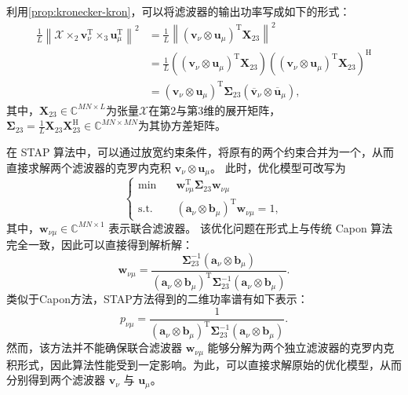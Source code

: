 利用\cref{prop:kronecker-kron}，可以将滤波器的输出功率写成如下的形式：
\[
    \begin{split}
        \frac{1}{L} \left\| \mathcal{X} \times_2 \bm{v}_{\nu}^{\mathrm{T}} \times_3 \bm{u}_{\mu}^{\mathrm{T}} \right\|^2
         & = \frac{1}{L} \left\| (\bm{v}_{\nu} \otimes \bm{u}_{\mu})^{\mathrm{T}} \mathbf{X}_{23}  \right\|^2                                                                           \\
         & = \frac{1}{L}  ((\bm{v}_{\nu} \otimes \bm{u}_{\mu})^{\mathrm{T}} \mathbf{X}_{23}) \left((\bm{v}_{\nu} \otimes \bm{u}_{\mu})^{\mathrm{T}} \mathbf{X}_{23}\right)^{\mathrm{H}} \\
         & = (\bm{v}_{\nu} \otimes \bm{u}_{\mu})^{\mathrm{T}} \mathbf{\Sigma}_{23} (\overline{\bm{v}}_{\nu} \otimes \overline{\bm{u}}_{\mu}),
    \end{split}
\]
其中，\( \mathbf{X}_{23} \in \mathbb{C}^{MN \times L} \)为张量\( \mathcal{X} \)在第2与第3维的展开矩阵，\( \mathbf{\Sigma}_{23} = \frac{1}{L} \mathbf{X}_{23} \mathbf{X}_{23}^{\mathrm{H}} \in \mathbb{C}^{MN \times MN} \)为其协方差矩阵。

在 STAP 算法中，可以通过放宽约束条件，将原有的两个约束合并为一个，从而直接求解两个滤波器的克罗内克积 \( \bm{v}_{\nu} \otimes \bm{u}_{\mu} \)。
此时，优化模型可改写为
\begin{equation}
    \begin{cases}
        \min \quad        & \bm{w}_{\nu\mu}^{\mathrm{T}} \mathbf{\Sigma}_{23} \bm{w}_{\nu\mu}      \\
        \text{s.t.} \quad & (\bm{a}_{\nu} \otimes \bm{b}_{\mu})^{\mathrm{T}} \bm{w}_{\nu\mu} = 1 ,
    \end{cases}
\end{equation}
其中，\( \bm{w}_{\nu\mu} \in \mathbb{C}^{MN \times 1} \) 表示联合滤波器。
该优化问题在形式上与传统 Capon 算法完全一致，因此可以直接得到解析解：
\begin{equation}
    \bm{w}_{\nu\mu}
    = \frac{\mathbf{\Sigma}_{23}^{-1} (\bm{a}_{\nu} \otimes \bm{b}_{\mu})}
    {(\bm{a}_{\nu} \otimes \bm{b}_{\mu})^{\mathrm{T}} \mathbf{\Sigma}_{23}^{-1} (\bm{a}_{\nu} \otimes \bm{b}_{\mu})}.
\end{equation}
类似于Capon方法，STAP方法得到的二维功率谱有如下表示：
\[
    p_{\nu\mu} =\frac{1}{(\bm{a}_{\nu} \otimes \bm{b}_{\mu})^{\mathrm{T}} \mathbf{\Sigma}_{23}^{-1} (\bm{a}_{\nu} \otimes \bm{b}_{\mu})}.
\]
然而，该方法并不能确保联合滤波器 \( \bm{w}_{\nu\mu} \) 能够分解为两个独立滤波器的克罗内克积形式，因此算法性能受到一定影响。为此，可以直接求解原始的优化模型，从而分别得到两个滤波器 \( \bm{v}_{\nu} \) 与 \( \bm{u}_{\mu} \)。

